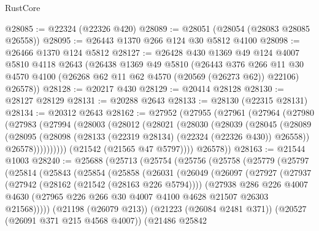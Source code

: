\begin{lexlean}{RustCore}
\begin{coremodule}
@28085 := @22324 (@22326 @420)
@28089 := @28051 (@28054 (@28083 @28085 @26558))
@28095 := @26443 @1370 @266 @124 @30 @5812 @4100
@28098 := @26466 @1370 @124 @5812
@28127 := @26428
    @430
    @1369
    @49
    @124
    @4007
    @5810
    @4118
    @2643
    (@26438
      @1369
      @49
      @5810
      (@26443
        @376
        @266
        @11
        @30
        @4570
        @4100
        (@26268 @62 @11 @62 @4570 (@20569 (@26273 @62)) @22106)
        @26578))
@28128 := @20217 @430
@28129 := @20414 @28128
@28130 := @28127 @28129
@28131 := @20288 @2643
@28133 := @28130 (@22315 @28131)
@28134 := @20312 @2643
@28162 := @27952
    (@27955
      (@27961
        (@27964
          (@27980
            (@27983
              (@27994
                (@28003
                  (@28012
                    (@28021
                      (@28030
                        (@28039
                          (@28045
                            (@28089
                              (@28095
                                (@28098 (@28133 (@22319 @28134) (@22324 (@22326 @430)) @26558))
                                @26578))))))))))
            (@21542 (@21565 @47 @5797))))
        @26578))
@28163 := @21544 @1003
@28240 := @25688
    (@25713
      (@25754
        (@25756
          (@25758
            (@25779
              (@25797
                (@25814
                  (@25843
                    (@25854
                      (@25858
                        (@26031
                          (@26049
                            (@26097
                              (@27927
                                (@27937
                                  (@27942 (@28162 (@21542 (@28163 @226 @5794))))
                                  (@27938
                                    @286
                                    @226
                                    @4007
                                    @4630
                                    (@27965
                                      @226
                                      @266
                                      @30
                                      @4007
                                      @4100
                                      @4628
                                      @21507
                                      @26303
                                      @21568)))))
                            (@21198 (@26079 @213))
                            (@21223 (@26084 @2481 @371))
                            (@20527 (@26091 @371 @215 @4568 @4007))
                            (@21486
                              @25842

\end{coremodule}
\end{lexlean}
